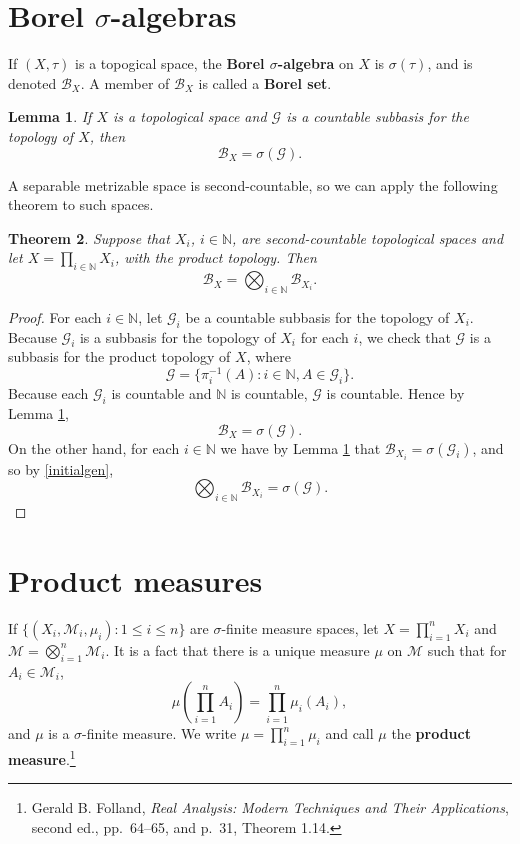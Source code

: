 \documentclass{article}
\newtheorem{theorem}{Theorem}
\newtheorem{lemma}[theorem]{Lemma}
\theoremstyle{definition}
\begin{document}
\section{Borel $\sigma$-algebras}
If $(X,\tau)$ is a topogical space, the \textbf{Borel $\sigma$-algebra} on $X$ is $\sigma(\tau)$, and is denoted $\mathscr{B}_X$. A member of $\mathscr{B}_X$ is called a \textbf{Borel
set}. 

\begin{lemma}
If $X$ is a topological space and $\mathscr{G}$ is a countable subbasis for the topology of $X$, then 
\[
\mathscr{B}_X = \sigma(\mathscr{G}).
\]
\label{subbasis}
\end{lemma}


A separable metrizable space is second-countable, so we can apply the following theorem to such spaces.

\begin{theorem}
Suppose that $X_i$, $i \in \mathbb{N}$, are second-countable topological spaces and let $X=\prod_{i \in \mathbb{N}} X_i$, with the product topology. Then
\[
\mathscr{B}_X = \bigotimes_{i \in \mathbb{N}} \mathscr{B}_{X_i}.
\]
\label{secondcountable}
\end{theorem}
\begin{proof}
For each $i \in \mathbb{N}$, let $\mathscr{G}_i$ be a countable subbasis for the topology of
$X_i$.
Because $\mathscr{G}_i$ is a subbasis for the topology of $X_i$ for each $i$, we check that
$\mathscr{G}$ is a subbasis for the product topology of $X$, where
\[
\mathscr{G} = \{\pi_i^{-1}(A): i \in \mathbb{N}, A \in \mathscr{G}_i\}.
\]
Because each $\mathscr{G}_i$ is countable and $\mathbb{N}$ is countable, $\mathscr{G}$ is countable. Hence by Lemma \ref{subbasis},
\[
\mathscr{B}_X = \sigma(\mathscr{G}).
\]
On the other hand,
for each $i \in \mathbb{N}$ we have by  Lemma \ref{subbasis} that $\mathscr{B}_{X_i}=\sigma(\mathscr{G}_i)$, and 
so by \eqref{initialgen},
\[
\bigotimes_{i \in \mathbb{N}} \mathscr{B}_{X_i}=\sigma(\mathscr{G}).
\]
\end{proof}




\section{Product measures}
If $\{(X_i,\mathscr{M}_i,\mu_i): 1 \leq i \leq n\}$ are $\sigma$-finite measure spaces, let $X=\prod_{i=1}^n X_i$ and $\mathscr{M}=\bigotimes_{i=1}^n
\mathscr{M}_i$. 
It is a fact that there is a unique  measure $\mu$ on $\mathscr{M}$ such that for $A_i \in \mathscr{M}_i$,
\[
\mu\left( \prod_{i=1}^n A_i \right) = \prod_{i=1}^n \mu_i(A_i),
\]
and $\mu$ is a $\sigma$-finite measure. We write $\mu=\prod_{i=1}^n \mu_i$ and call $\mu$ the \textbf{product measure}.\footnote{Gerald
B. Folland, {\em Real Analysis: Modern Techniques and Their Applications}, second ed., pp.~64--65, and p.~31, Theorem 1.14.}
\end{document}

